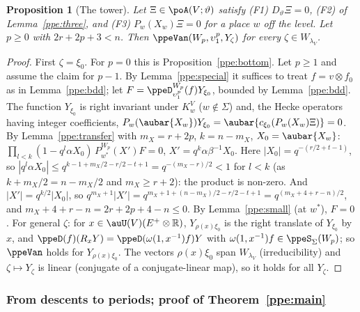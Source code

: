 \documentclass[10pt]{amsart}
\newtheorem{proposition}[theorem]{Proposition}
\theoremstyle{definition}
\theoremstyle{remark}
\newcommand{\R}{\mathbb R}
\begin{document}
\begin{proposition}[The tower]\label{ppe:tower}
Let $\Xi\in\poA(V;\vartheta)$ satisfy
\textup{(F1)} $D_\vartheta\Xi=0$, \textup{(F2)} of Lemma~\textup{\ref{ppe:three}}, and
\textup{(F3)} $P_w(X_w)\Xi=0$ for a place $w$ off the level. Let $p\ge0$ with $2r+2p+3<n$. Then
$\ppeVan(W_p,\upsilon_1^p,Y_\zeta)$ for every $\zeta\in W_{\lambda_V}$.
\end{proposition}
\begin{proof}
First $\zeta=\xi_0$. For $p=0$ this is Proposition~\ref{ppe:bottom}. Let $p\ge1$ and assume the
claim for $p-1$. By Lemma~\ref{ppe:special} it suffices to treat $f=v\otimes f_0$ as in
Lemma~\ref{ppe:bdd}; let $F=\ppeD^{W_p}_{\upsilon_1^p}(f)Y_{\xi_0}$, bounded by Lemma~\ref{ppe:bdd}.
The function $Y_{\xi_0}$ is right invariant under $K^V_w$ ($w\notin\Sigma$) and, the Hecke operators
having integer coefficients, $P_w(\aubar{X_w})Y_{\xi_0}=\aubar{c_{\xi_0}(P_w(X_w)\Xi)}=0$. By
Lemma~\ref{ppe:transfer} with $m_X=r+2p$, $k=n-m_X$, $X_0=\aubar{X_w}$:
$\prod_{l<k}(1-q^l\alpha X_0)\,P^{W_p}_{w^\ast}(X')F=0$, $X'=q^k\alpha\beta^{-1}X_0$. Here
$|X_0|=q^{-(r/2+t-1)}$, so $|q^l\alpha X_0|\le q^{k-1+m_X/2-r/2-t+1}=q^{-(m_X-r)/2}<1$ for $l<k$ (as
$k+m_X/2=n-m_X/2$ and $m_X\ge r+2$): the product is non-zero. And $|X'|=q^{k/2}|X_0|$, so
$q^{m_X+1}|X'|=q^{m_X+1+(n-m_X)/2-r/2-t+1}=q^{(m_X+4+r-n)/2}$, and $m_X+4+r-n=2r+2p+4-n\le0$.
By Lemma~\ref{ppe:small} (at $w^\ast$), $F=0$. For general $\zeta$: for $x\in\auU(V)(E^+\otimes\R)$,
$Y_{\rho(x)\xi_0}$ is the right translate of $Y_{\xi_0}$ by $x$, and
$\ppeD(f)(R_xY)=\ppeD(\omega(1,x^{-1})f)Y$ with $\omega(1,x^{-1})f\in\ppeS_\Sigma(W_p)$; so
$\ppeVan$ holds for $Y_{\rho(x)\xi_0}$. The vectors $\rho(x)\xi_0$ span $W_{\lambda_V}$
(irreducibility) and $\zeta\mapsto Y_\zeta$ is linear (conjugate of a conjugate-linear map), so it
holds for all $Y_\zeta$.
\end{proof}

\subsubsection{From descents to periods; proof of Theorem~\ref{ppe:main}}\label{ppe:ss-periods}
\end{document}
